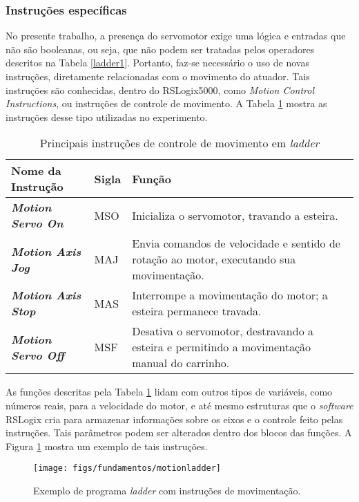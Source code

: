 \subsubsection{Instruções específicas}
No presente trabalho, a presença do servomotor exige uma lógica e entradas que não são booleanas, ou seja, que não podem ser tratadas pelos operadores descritos na Tabela \ref{ladder1}. Portanto, faz-se necessário o uso de novas instruções, diretamente relacionadas com o movimento do atuador. Tais instruções são conhecidas, dentro do RSLogix5000, como \textit{Motion Control Instructions}, ou instruções de controle de movimento. A Tabela \ref{ladder2} mostra as instruções desse tipo utilizadas no experimento.

\begin{table}[!ht]
  \centering
  \caption{Principais instruções de controle de movimento em \textit{ladder} \label{ladder2}}
  \begin{tabularx}{\textwidth}{|>{\bfseries}l|l|X|}
    \hline
    Nome da Instrução & Sigla & Função \\ \hline
    \textit{Motion Servo On} & MSO & Inicializa o servomotor, travando a esteira. \\ \hline
    \textit{Motion Axis Jog} & MAJ & Envia comandos de velocidade e sentido de rotação ao motor, executando sua movimentação. \\ \hline
    \textit{Motion Axis Stop} & MAS & Interrompe a movimentação do motor; a esteira permanece travada. \\ \hline
    \textit{Motion Servo Off} & MSF & 
    Desativa o servomotor, destravando a esteira e permitindo a movimentação manual do carrinho.\\ \hline
  \end{tabularx}
\end{table}

As funções descritas pela Tabela \ref{ladder2} lidam com outros tipos de variáveis, como números reais, para a velocidade do motor, e até mesmo estruturas que o \textit{software} RSLogix cria para armazenar informações sobre os eixos e o controle feito pelas instruções. Tais parâmetros podem ser alterados dentro dos blocos das funções. A Figura \ref{motionladder1} mostra um exemplo de tais instruções.

\begin{figure}[!ht]
  \centering
    \texttt{[image: figs/fundamentos/motionladder]}
    \caption{Exemplo de programa \textit{ladder} com instruções de movimentação.\label{motionladder1}}
\end{figure}

